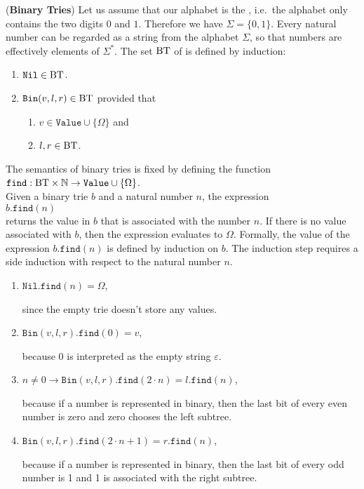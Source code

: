 \exercise
(\textbf{Binary Tries})  Let us assume that our alphabet is the , i.e.~the alphabet
only contains the two digits $0$ and $1$.  Therefore we have $\Sigma = \{0,1\}$.  Every natural
number can be regarded as a string from the alphabet $\Sigma$, so that numbers are effectively
elements of $\Sigma^*$.  The set $\mathrm{BT}$ of  is defined by induction:
\begin{enumerate}
\item $\texttt{Nil} \in \mathrm{BT}$.
\item $\texttt{Bin}(v,l,r) \in \mathrm{BT}$ provided that
      \begin{enumerate}
      \item $v \in \texttt{Value} \cup \{\Omega\}$ \quad and
      \item $l,r \in \mathrm{BT}$.
      \end{enumerate}
\end{enumerate}
The semantics of binary tries is fixed by defining the function
\\[0.2cm]
\hspace*{1.3cm}
$\texttt{find}: \mathrm{BT} \times \mathbb{N} \rightarrow \texttt{Value} \cup \{ \Omega \}$.
\\[0.2cm]
Given a binary trie $b$ and a natural number $n$, the expression
\\[0.2cm]
\hspace*{1.3cm}
$b.\texttt{find}(n)$ 
\\[0.2cm]
returns the value in $b$ that is associated with the number $n$.  If there is no value associated
with $b$, then the expression evaluates to $\Omega$.  Formally, the value of the expression
 $b.\texttt{find}(n)$ is defined by induction on $b$.  The induction step requires a side induction
 with respect to the natural number $n$.
\begin{enumerate}
\item $\texttt{Nil}.\texttt{find}(n) = \Omega$,

      since the empty trie doesn't store any values.
\item $\texttt{Bin}(v,l,r).\texttt{find}(0) = v$,

      because $0$ is interpreted as the empty string $\varepsilon$.
\item $n \not= 0 \rightarrow \texttt{Bin}(v,l,r).\texttt{find}(2\cdot n) = l.\texttt{find}(n)$,

      because if a number is represented in binary, then the last bit of every even number is zero
      and zero chooses the left subtree.
\item $\texttt{Bin}(v,l,r).\texttt{find}(2 \cdot n + 1) = r.\texttt{find}(n)$,

      because if a number is represented in binary, then the last bit of every odd number is 1 and 
      1 is associated with the right subtree.
\end{enumerate}
